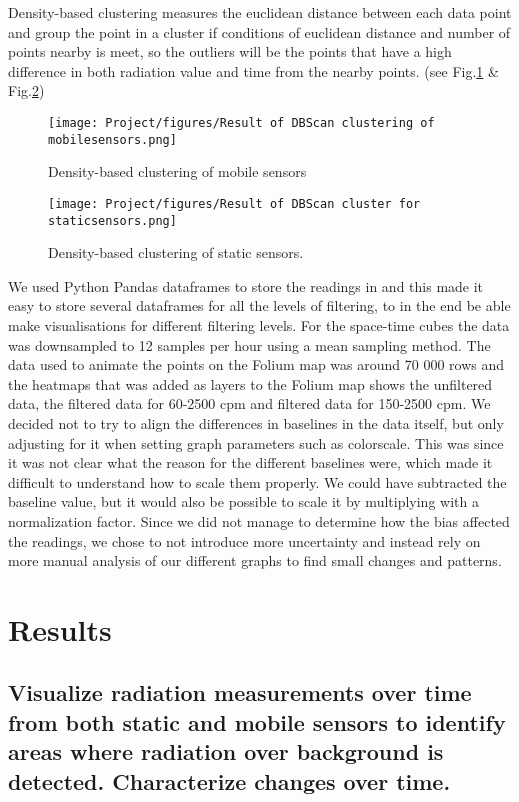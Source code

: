\documentclass[journal]{vgtc}                %
\begin{document}
Density-based clustering measures the euclidean distance between each data point and group the point in a cluster if conditions of euclidean distance and number of points nearby is meet, so the outliers will be the points that have a high difference in both radiation value and time from the nearby points. (see Fig.\ref{fig:DBScanMobile} & Fig.\ref{fig:DBScanStatic})
\begin{figure}[h!]
    \centering
    \texttt{[image: Project/figures/Result of DBScan clustering of mobilesensors.png]}
    \caption{Density-based clustering of mobile sensors}
    \label{fig:DBScanMobile}
\end{figure}
\begin{figure}[h!]
    \centering
    \texttt{[image: Project/figures/Result of DBScan cluster for staticsensors.png]}
    \caption{Density-based clustering of static sensors.}
    \label{fig:DBScanStatic}
\end{figure}
\newpage
We used Python Pandas dataframes\cite{Pandas} to store the readings in and this made it easy to store several dataframes for all the levels of filtering, to in the end be able make visualisations for different filtering levels. 
For the space-time cubes the data was downsampled to 12 samples per hour using a mean sampling method. 
The data used to animate the points on the Folium map was around 70 000 rows and the heatmaps that was added as layers to the Folium map\cite{Folium} shows the unfiltered data, the filtered data for 60-2500 cpm and filtered data for 150-2500 cpm.  
We decided not to try to align the differences in baselines in the data itself, but only adjusting for it when setting graph parameters such as colorscale. This was since it was not clear what the reason for the different baselines were, which made it difficult to understand how to scale them properly. We could have subtracted the baseline value, but it would also be possible to scale it by multiplying with a normalization factor. Since we did not manage to determine how the bias affected the readings, we chose to not introduce more uncertainty and instead rely on more manual analysis of our different graphs to find small changes and patterns. 

\section{Results}

\subsection{Visualize radiation measurements over time from both static and mobile sensors to identify areas where radiation over background is detected. Characterize changes over time.}
\end{document}
